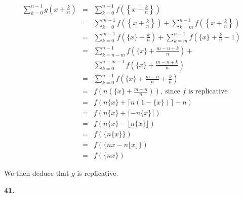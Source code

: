\documentclass[a4paper,12pt]{article}
\newcommand{\newpar}[1]{\bigskip \noindent \textbf{#1.}}
\begin{document}
\begin{eqnarray*}
  \sum_{k=0}^{n-1}g\left(x+\frac{k}{n}\right) &=&
  \sum_{k=0}^{n-1}f\left(\left\{x+\frac{k}{n}\right\}\right) \\
  &=&   \sum_{k=0}^{m-1}f\left(\left\{x+\frac{k}{n}\right\}\right) +
  \sum_{k=m}^{n-1}f\left(\left\{x+\frac{k}{n}\right\}\right) \\
  &=& \sum_{k=0}^{m-1}f\left(\{x\} + \frac{k}{n}\right) +
  \sum_{k=m}^{n-1}f\left(\{x\}+\frac{k}{n}-1\right) \\
  &=& \sum_{k=n-m}^{n-1}f\left(\{x\}+\frac{m-n+k}{n}\right) +\\
  &&\sum_{k=0}^{n-m-1}f\left(\{x\} + \frac{m-n+k}{n}\right) \\
  &=& \sum_{k=0}^{n-1}f\left(\{x\}+\frac{m-n}{n} + \frac{k}{n}\right)
  \\
  &=& f\left(n\left(\{x\} + \frac{m -
    n}{n}\right)\right),\ \mbox{since $f$ is replicative} \\
  &=& f(n\{x\} + \lceil n(1-\{x\})\rceil - n ) \\
  &=& f(n\{x\} + \lceil - n\{x\}\rceil) \\
  &=& f(n\{x\} - \lfloor n\{x\}\rfloor) \\
  &=& f(\{n\{x\}\}) \\
  &=& f(\{nx - n\lfloor x\rfloor\}) \\
  &=& f(\{nx\})
\end{eqnarray*}

We then deduce that $g$ is replicative.

\newpar{41} 
\end{document}
